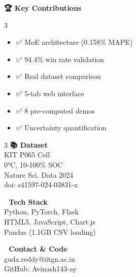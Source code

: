 \documentclass[final,a0paper,portrait]{a0poster}
\begin{document}
\begin{center}
\colorbox{primaryblue}{
\begin{minipage}{0.95\textwidth}
\color{white}
\begin{center}
\textbf{\LARGE 🏆 Key Contributions}
\end{center}
\vspace{0.3cm}

\begin{multicols}{3}
\begin{itemize}
    \item ✅ MoE architecture (0.158\% MAPE)
    \item ✅ 94.4\% win rate validation
    \item ✅ Real dataset comparison
    \item ✅ 5-tab web interface
    \item ✅ 8 pre-computed demos
    \item ✅ Uncertainty quantification
\end{itemize}
\end{multicols}

\vspace{0.5cm}

\begin{multicols}{3}
\textbf{📚 Dataset}\\
KIT P065 Cell\\
0°C, 10-100\% SOC\\
Nature Sci. Data 2024\\
doi: s41597-024-03831-x

\columnbreak

\textbf{🔧 Tech Stack}\\
Python, PyTorch, Flask\\
HTML5, JavaScript, Chart.js\\
Pandas (1.1GB CSV loading)

\columnbreak

\textbf{📧 Contact \& Code}\\
guda.reddy@iitgn.ac.in\\
GitHub: Avinash143-ay\\

\end{multicols}

\vspace{0.3cm}

\end{minipage}
}
\end{center}
\end{document}
